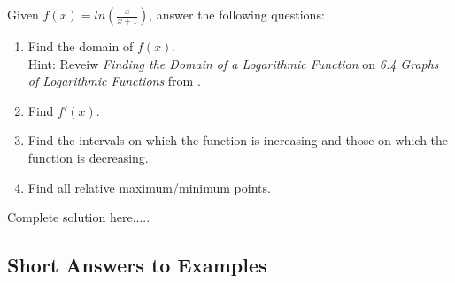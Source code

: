 \begin{example}
Given $f(x)=ln\left(\displaystyle\frac{x}{x+1}\right)$, answer the following questions:
\renewcommand{\labelenumi}{\textbf{(\alph{enumi})}}
\begin{enumerate}[leftmargin=*]
    \item Find the domain of $f(x)$. \\
    Hint: Reveiw \emph{Finding the Domain of a Logarithmic Function} on \emph{6.4 Graphs of Logarithmic Functions} from \cite{openstaxColAlgebra} \footnotemark[1]. 
    \item Find $f'(x)$.
     \item Find the intervals on which the function is increasing and those on which the function is decreasing.
    \item Find all relative maximum/minimum points.
\end{enumerate}
    \begin{sol}
    \end{sol}
    \begin{solL}
    Complete solution here.....
    
    \end{solL}
    
\end{example}


\newpage

\subsection*{Short Answers to Examples}



